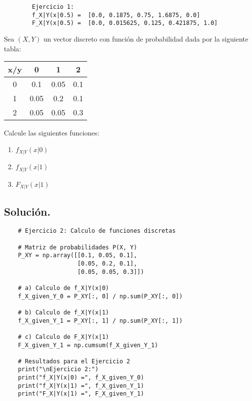 \documentclass[a4paper,12pt]{article}
\begin{document}
    \begin{verbatim}
        Ejercicio 1:
        f_X|Y(x|0.5) =  [0.0, 0.1875, 0.75, 1.6875, 0.0]
        F_X|Y(x|0.5) =  [0.0, 0.015625, 0.125, 0.421875, 1.0]
    \end{verbatim}



    \begin{example}
        Sea $(X,Y)$ un vector discreto con función de probabilidad dada por la siguiente tabla:
            \begin{table}[H]
            \centering
            \begin{tabular}{|c|c|c|c|}
            \hline
            \textbf{x/y} & 0 & 1 & 2 \\
            \hline
            0 & 0.1 & 0.05 & 0.1 \\
            \hline
            1 & 0.05 & 0.2 & 0.1 \\
            \hline
            2 & 0.05 & 0.05 & 0.3 \\
            \hline
            \end{tabular}
            \end{table}
        Calcule las siguientes funciones:
        \begin{enumerate}[label=\alph*)]  
            \item $f_{X|Y}(x|0)$
            \item $f_{X|Y}(x|1)$
            \item $F_{X|Y}(x|1)$
        \end{enumerate}
    \end{example}
    
    \subsection*{Solución.}
    \begin{lstlisting}
    # Ejercicio 2: Calculo de funciones discretas
    
    # Matriz de probabilidades P(X, Y)
    P_XY = np.array([[0.1, 0.05, 0.1],
                     [0.05, 0.2, 0.1],
                     [0.05, 0.05, 0.3]])
    
    # a) Calculo de f_X|Y(x|0)
    f_X_given_Y_0 = P_XY[:, 0] / np.sum(P_XY[:, 0])
    
    # b) Calculo de f_X|Y(x|1)
    f_X_given_Y_1 = P_XY[:, 1] / np.sum(P_XY[:, 1])
    
    # c) Calculo de F_X|Y(x|1)
    F_X_given_Y_1 = np.cumsum(f_X_given_Y_1)
    
    # Resultados para el Ejercicio 2
    print("\nEjercicio 2:")
    print("f_X|Y(x|0) =", f_X_given_Y_0)
    print("f_X|Y(x|1) =", f_X_given_Y_1)
    print("F_X|Y(x|1) =", F_X_given_Y_1)
    \end{lstlisting}
\end{document}
